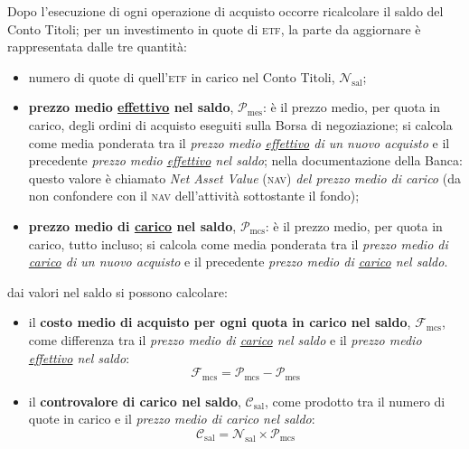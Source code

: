 \documentclass[12pt,a4paper]{article}
\newcommand{\Nav}[0]{\textsc{nav}}
\newcommand{\Etf}[1]{\textsc{etf}}
\newcommand{\Nsal}[1]{\mathcal{N}_{\textrm{sal}#1}}
\newcommand{\Pme}[1]{\mathcal{P}_{\mathrm{me}#1}}
\newcommand{\Pmes}[1]{\Pme{\mathrm{s}#1}}
\newcommand{\Pmc}[1]{\mathcal{P}_{\mathrm{mc}#1}}
\newcommand{\Pmcs}[1]{\Pmc{\mathrm{s}#1}}
\newcommand{\Csal}[1]{\mathcal{C}_{\mathrm{sal}#1}}
\newcommand{\Fmcs}[1]{\mathcal{F}_{\mathrm{mcs}#1}}
\begin{document}
Dopo l'esecuzione di ogni operazione di acquisto  occorre ricalcolare il saldo del Conto Titoli; per
un investimento in quote di \Etf{}, la parte da aggiornare è rappresentata dalle tre quantità:
\begin{itemize}
\item numero di quote di quell'\Etf{} in carico nel Conto Titoli, \(\Nsal{}\);
\item \textbf{prezzo  medio \underline{effettivo} nel  saldo}, \(\Pmes{}\):  è il prezzo  medio, per
  quota in carico,  degli ordini di acquisto  eseguiti sulla Borsa di negoziazione;  si calcola come
  media  ponderata tra  il  \emph{prezzo medio  \underline{effettivo}  di un  nuovo  acquisto} e  il
  precedente \emph{prezzo medio \underline{effettivo} nel  saldo}; nella documentazione della Banca:
  questo valore è chiamato \emph{Net Asset Value} (\Nav{}) \emph{del prezzo medio di carico} (da non
  confondere con il \Nav{} dell'attività sottostante il fondo);
\item \textbf{prezzo  medio di \underline{carico}  nel saldo}, \(\Pmcs{}\):  è il prezzo  medio, per
  quota in  carico, tutto  incluso; si  calcola come media  ponderata tra  il \emph{prezzo  medio di
     \underline{carico}   di  un   nuovo   acquisto}   e  il   precedente   \emph{prezzo  medio   di
     \underline{carico} nel saldo}.
\end{itemize}
dai valori nel saldo si possono calcolare:
\begin{itemize}
\item il  \textbf{costo medio di  acquisto per  ogni quota in  carico nel saldo},  \(\Fmcs{}\), come
  differenza tra  il \emph{prezzo  medio di  \underline{carico} nel saldo}  e il  \emph{prezzo medio
     \underline{effettivo} nel saldo}:
  \begin{equation*}
    \Fmcs{} = \Pmcs{} - \Pmes{}
  \end{equation*}
\item il  \textbf{controvalore di  carico nel saldo},  \(\Csal{}\), come prodotto  tra il  numero di
  quote in carico e il \emph{prezzo medio di carico nel saldo}:
  \begin{equation*}
    \Csal{} = \Nsal{} \times{} \Pmcs{}
  \end{equation*}
\end{itemize}
\end{document}
